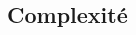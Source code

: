 \documentclass[10pt,fleqn]{article} %
\begin{document}
\begin{multicols}{2}
\section{Complexité}

\end{multicols}
\newpage
%
%
%
%
%
%
%
%
%
%
%
%
%
\end{document}

